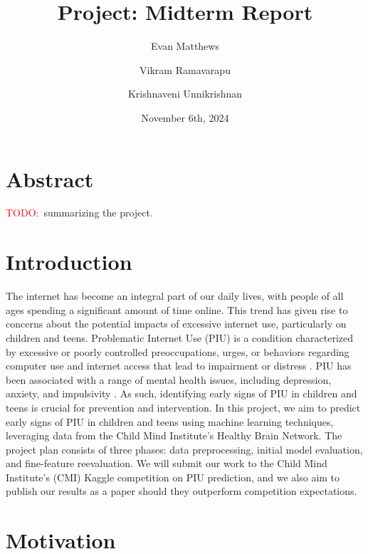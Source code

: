 \documentclass[11pt]{extarticle}
\title{Project: Midterm Report}
\author[1]{Evan Matthews}
\author[1]{Vikram Ramavarapu}
\author[1]{Krishnaveni Unnikrishnan}
\affil[1]{CS 412 Group G6}
\date{November 6th, 2024}
\newcommand{\todo}{\textcolor{red}{TODO:}~}
\begin{document}
\maketitle

\pagebreak


\section{Abstract}
\todo summarizing the project\cite{Pettorruso2020-qt,Cash2012-rb,Aboujaoude2010-mc,Restrepo2020-pb}.

\begin{mdframed}
\end{mdframed}

\section{Introduction}

The internet has become an integral part of our daily lives, with people of all ages spending a significant amount of time online. 
This trend has given rise to concerns about the potential impacts of excessive internet use, particularly on children and teens.
Problematic Internet Use (PIU) is a condition characterized by excessive or poorly controlled preoccupations, urges, or behaviors regarding computer use and internet access that lead to impairment or distress \cite{Pettorruso2020-qt}. 
PIU has been associated with a range of mental health issues, including depression, anxiety, and impulsivity \cite{Cash2012-rb}.
As such, identifying early signs of PIU in children and teens is crucial for prevention and intervention.
In this project, we aim to predict early signs of PIU in children and teens using machine learning techniques, leveraging data from the Child Mind Institute's Healthy Brain Network.
The project plan consists of three phases: data preprocessing, initial model evaluation, and fine-feature reevaluation.
We will submit our work to the Child Mind Institute's (CMI) Kaggle competition on PIU prediction, and we also aim to publish our results as a paper should they outperform competition expectations.


\section{Motivation} 
\end{document}
